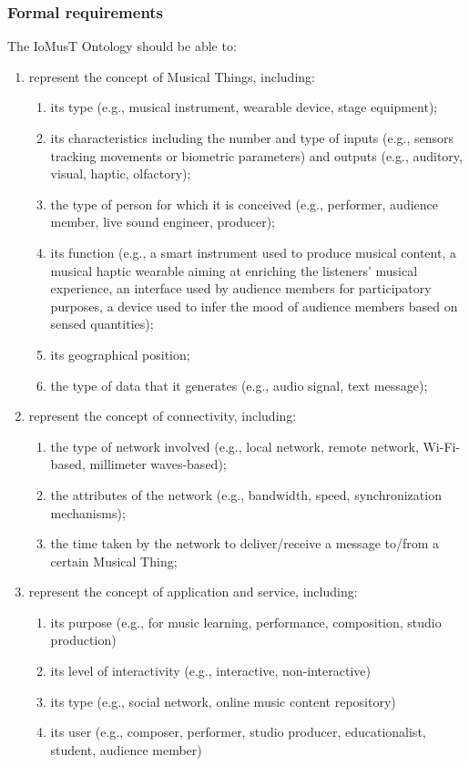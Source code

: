 \subsubsection{\textsf{Formal requirements}}
The IoMusT Ontology should be able to:
\begin{multicols}{2}
\begin{enumerate}

\item represent the concept of Musical Things, including: 
	\begin{enumerate}[wide, labelindent=0pt]
	\item its type (e.g., musical instrument, wearable device, stage equipment);
	\item its characteristics including the number and type of inputs (e.g., sensors tracking movements or biometric parameters) and outputs (e.g., auditory, visual, haptic, olfactory);
	\item the type of person for which it is conceived (e.g., performer, audience member, live sound engineer, producer); 
	\item its function (e.g., a smart instrument used to produce musical content, a musical haptic wearable aiming at enriching the listeners' musical experience, an interface used by audience members for participatory purposes, a device used to infer the mood of audience members based on sensed quantities);
	\item its geographical position;
	\item the type of data that it generates (e.g., audio signal, text message);
	\end{enumerate}
	
\item represent the concept of connectivity, including: 
	\begin{enumerate}[wide, labelindent=0pt]
	\item the type of network involved (e.g., local network, remote network, Wi-Fi-based, millimeter waves-based);
	\item the attributes of the network (e.g., bandwidth, speed, synchronization mechanisms);
	\item the time taken by the network to deliver/receive a message to/from a certain Musical Thing;
	\end{enumerate}

\item represent the concept of application and service, including:
	\begin{enumerate}[wide, labelindent=0pt]
	\item its purpose (e.g., for music learning, performance, composition, studio production)
	\item its level of interactivity (e.g., interactive, non-interactive)
	\item its type (e.g., social network, online music content repository)
	\item its user (e.g., composer, performer, studio producer, educationalist, student, audience member)
	\end{enumerate}


\end{enumerate}
\end{multicols}
